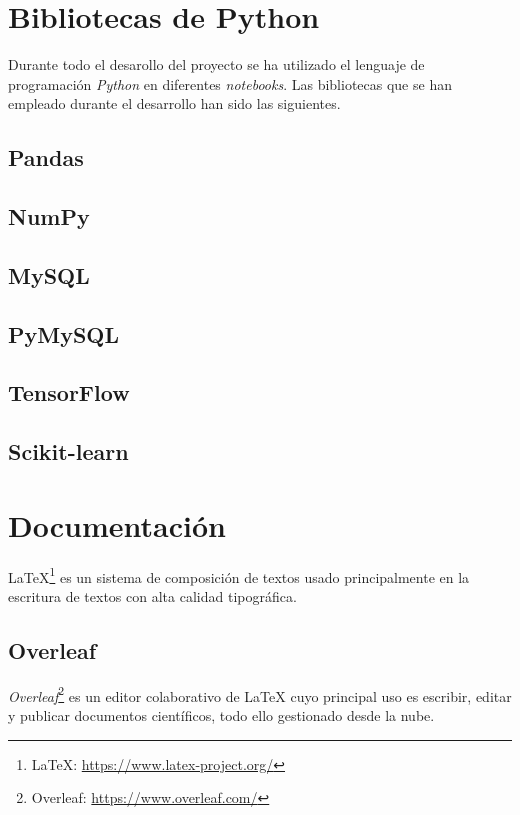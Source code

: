 \section{Bibliotecas de Python}
Durante todo el desarollo del proyecto se ha utilizado el lenguaje de programación \emph{Python} en diferentes \emph{notebooks}. Las bibliotecas que se han empleado durante el desarrollo han sido las siguientes.

\subsection{Pandas}

\subsection{NumPy}

\subsection{MySQL}

\subsection{PyMySQL}

\subsection{TensorFlow}

\subsection{Scikit-learn}

\section{Documentación}
\LaTeX\footnote{\LaTeX: \url{https://www.latex-project.org/}} es un sistema de composición de textos usado principalmente en la escritura de textos con alta calidad tipográfica. 

\subsection{Overleaf}
\emph{Overleaf}\footnote{Overleaf: \url{https://www.overleaf.com/}} es un editor colaborativo de \LaTeX{} cuyo principal uso es escribir, editar y publicar documentos científicos, todo ello gestionado desde la nube.


